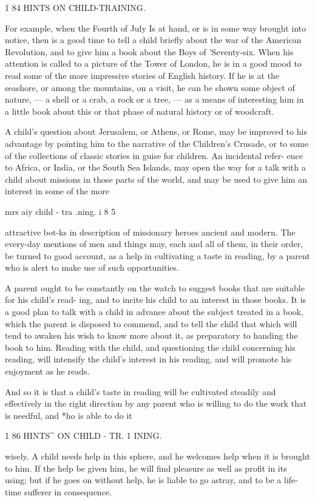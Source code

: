 \documentclass[
]{book}
\begin{document}
1 84 HINTS ON CHILD-TRAINING.

For example, when the Fourth of July Is at hand, or is in some way brought into notice, then is a good time to tell a child briefly about the war of the American Revolution, and to give him a book about the Boys of 'Seventy-six. When his attention is called to a picture of the Tower of London, he is in a good mood to read some of the more impressive stories of English history. If he is at the seashore, or among the mountains, on a visit, he can be shown some object of nature, --- a shell or a crab, a rock or a tree, --- as a means of interesting him in a little book about this or that phase of natural history or of woodcraft.

A child's question about Jerusalem, or Athens, or Rome, may be improved to his advantage by pointing him to the narrative of the Children's Crusade, or to some of the collections of classic stories in guise for children. An incidental refer- ence to Africa, or India, or the South Sea Islands, may open the way for a talk with a child about missions in those parts of the world, and may be used to give him an interest in some of the more

mrs aiy child - tra .ning. i 8 5

attractive bot-ks in description of missionary heroes ancient and modern. The every-day mentions of men and things may, each and all of them, in their order, be turned to good account, as a help in cultivating a taste in reading, by a parent who is alert to make use of such opportunities.

A parent ought to be constantly on the watch to suggest books that are suitable for his child's read- ing, and to incite his child to an interest in those books. It is a good plan to talk with a child in advance about the subject treated in a book, which the parent is disposed to commend, and to tell the child that which will tend to awaken his wish to know more about it, as preparatory to handing the book to him. Reading with the child, and questioning the child concerning his reading, will intensify the child's interest in his reading, and will promote his enjoyment as he reads.

And so it is that a child's taste in reading will be cultivated steadily and effectively in the right direction by any parent who is willing to do the work that is needful, and *ho is able to do it

1 86 HINTS\^{} ON CHILD - TR. 1 INING.

wisely. A child needs help in this sphere, and he welcomes help when it is brought to him. If the help be given him, he will find pleasure as well as profit in its using; but if he goes on without help, he is liable to go astray, and to be a life- time sufferer in consequence.
\end{document}
